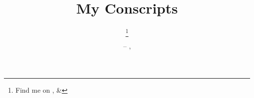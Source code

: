 \title{My Conscripts}
\author{\thanks{Find me on ,  \& }}
\date{  -- \DTMmonthname{\number\month} \number\day, \number\year}